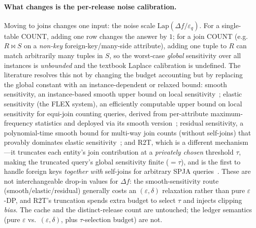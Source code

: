 \documentclass[sigconf,nonacm]{acmart}
\newcommand{\eps}{\varepsilon}
\newcommand{\Lap}{\mathrm{Lap}}
\begin{document}
\paragraph{What changes is the per-release noise calibration.}
Moving to joins changes one input: the noise scale $\Lap(\Delta f/\eps_q)$. For a single-table COUNT, adding one row changes the answer by $1$; for a join COUNT (e.g.\ $R\bowtie S$ on a \emph{non-key} foreign-key/many-side attribute), adding one tuple to $R$ can match arbitrarily many tuples in $S$, so the worst-case \emph{global} sensitivity over all instances is \emph{unbounded} and the textbook Laplace calibration is undefined. The literature resolves this not by changing the budget accounting but by replacing the global constant with an instance-dependent or relaxed bound: smooth sensitivity, an instance-based smooth upper bound on local sensitivity~\cite{nissim2007smooth}; elastic sensitivity (the FLEX system), an efficiently computable upper bound on local sensitivity for equi-join counting queries, derived from per-attribute maximum-frequency statistics and deployed via its smooth version~\cite{johnson2018towards}; residual sensitivity, a polynomial-time smooth bound for multi-way join counts (without self-joins) that provably dominates elastic sensitivity~\cite{dong2021residual}; and R2T, which is a different mechanism---it truncates each entity's join contribution at a \emph{privately chosen} threshold $\tau$, making the truncated query's global sensitivity finite ($=\tau$), and is the first to handle foreign keys \emph{together with} self-joins for arbitrary SPJA queries~\cite{dong2022r2t}. These are not interchangeable drop-in values for $\Delta f$: the smooth-sensitivity route (smooth/elastic/residual) generally costs an $(\eps,\delta)$ relaxation rather than pure $\eps$-DP, and R2T's truncation spends extra budget to select $\tau$ and injects clipping \emph{bias}. The cache and the distinct-release count are untouched; the ledger semantics (pure $\eps$ vs.\ $(\eps,\delta)$, plus $\tau$-selection budget) are not.
\end{document}
